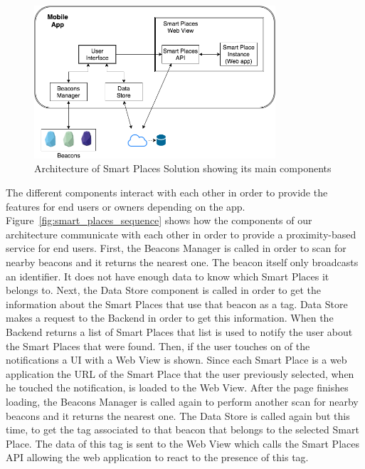 \begin{figure}[!ht]
  \centering
    \includegraphics[width=0.8\textwidth, keepaspectratio]{images/smart_places_architecture}
    \caption[Smart Places Solution Architecture]{Architecture of Smart Places Solution showing its main components}
    \label{fig:smart_places_architecture}
\end{figure}

The different components interact with each other in order to provide the features for end users or owners depending on the app.
Figure~\ref{fig:smart_places_sequence} shows how the components of our architecture communicate with each other in order to provide a proximity-based service for end users.
First, the Beacons Manager is called in order to scan for nearby beacons and it returns the nearest one.
The beacon itself only broadcasts an identifier.
It does not have enough data to know which Smart Places it belongs to.
Next, the Data Store component is called in order to get the information about the Smart Places that use that beacon as a tag.
Data Store makes a request to the Backend in order to get this information.
When the Backend returns a list of Smart Places that list is used to notify the user about the Smart Places that were found.
Then, if the user touches on of the notifications a \gls{UI} with a Web View is shown.
Since each Smart Place is a web application the \gls{URL} of the Smart Place that the user previously selected, when he touched the notification, is loaded to the Web View.
After the page finishes loading, the Beacons Manager is called again to perform another scan for nearby beacons and it returns the nearest one.
The Data Store is called again but this time, to get the tag associated to that beacon that belongs to the selected Smart Place.
The data of this tag is sent to the Web View which calls the Smart Places \gls{API} allowing the web application to react to the presence of this tag.

